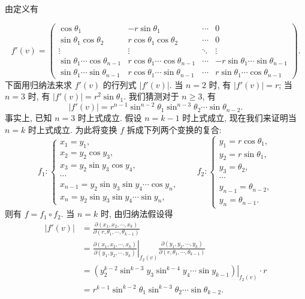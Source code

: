 \documentclass[12pt,fontset=fandol]{ctexart}
\begin{document}
\begin{solve}\quad 由定义有

\[
  f'(v)=
  \begin{pmatrix}
    \cos\theta_1&-r\sin\theta_1&\cdots&0\\
    \sin\theta_1\cos\theta_2&r\cos\theta_1\cos\theta_2&\cdots&0\\
    \vdots&\vdots&\ddots&\vdots\\
    \sin\theta_1\cdots\cos\theta_{n-1}&r\cos\theta_1\cdots\cos\theta_{n-1}&\cdots&-r\sin\theta_1\cdots\sin\theta_{n-1}\\
    \sin\theta_1\cdots\sin\theta_{n-1}&r\cos\theta_1\cdots\sin\theta_{n-1}&\cdots&r\sin\theta_1\cdots\cos\theta_{n-1}
  \end{pmatrix}.
\]
下面用归纳法来求 $f'(v)$ 的行列式 $|f'(v)|$. 当 $n=2$ 时, 有 $|f'(v)|=r$; 当 $n=3$ 时, 有 $|f'(v)|=r^2\sin\theta_1$. 我们猜测对于 $n\geqslant3$, 有
\[
  |f'(v)|=r^{n-1}\sin^{n-2}\theta_1\sin^{n-3}\theta_2\cdots\sin\theta_{n-2}.
\]
事实上, 已知 $n=3$ 时上式成立. 假设 $n=k-1$ 时上式成立, 现在我们来证明当 $n=k$ 时上式成立. 为此将变换 $f$ 拆成下列两个变换的复合:
\[
  f_1:\begin{cases}
    x_1=y_1,\\
    x_2=y_2\cos y_3,\\
    x_3=y_2\sin y_3\cos y_4,\\
    \cdots\\
    x_{n-1}=y_2\sin y_3\sin y_4\cdots\cos y_n,\\
    x_n=y_2\sin y_3\sin y_4\cdots\sin y_n,
  \end{cases}
  \qquad
  f_2:\begin{cases}
    y_1=r\cos\theta_1,\\
    y_2=r\sin\theta_1,\\
    y_3=\theta_2,\\
    \cdots\\
    y_{n-1}=\theta_{n-2},\\
    y_n=\theta_{n-1}.
  \end{cases}
\]
则有 $f=f_1\circ f_2$. 当 $n=k$ 时, 由归纳法假设得
\[
\begin{aligned}
  |f'(v)|
  &=
  \frac{\partial(x_1,x_2,\cdots,x_k)}
  {\partial(r,\theta_1,\cdots,\theta_{k-1})}\\
  &=
  \left.
  \frac{\partial(x_1,x_2,\cdots,x_k)}
  {\partial(y_1,y_2,\cdots,y_k)}
  \right|_{f_2(v)}
  \frac{\partial(y_1,y_2,\cdots,y_k)}
  {\partial(r,\theta_1,\cdots,\theta_{k-1})}\\
  &=
  \left.(y_2^{k-2}\sin^{k-3}y_3\sin^{k-4}y_4\cdots\sin y_{k-1})\right|_{f_2(v)}
  \cdot r\\
  &=r^{k-1}\sin^{k-2}\theta_1\sin^{k-3}\theta_2\cdots\sin\theta_{k-2}.
\end{aligned}
\]

\end{solve}
\end{document}

